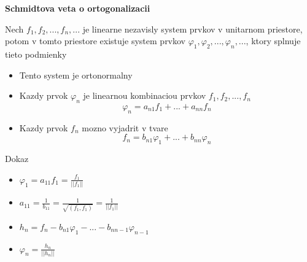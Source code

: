 \documentclass[12pt]{article}
\begin{document}
\vspace{1cm}
\textbf{Schmidtova veta o ortogonalizacii}

Nech $f_{1},f_{2},...,f_{n},...$ je linearne nezavisly system prvkov v unitarnom priestore, potom v tomto priestore existuje system prvkov
$\varphi_{1},\varphi_{2},...,\varphi_{n},...$, ktory splnuje tieto podmienky
\begin{itemize}
	\item Tento system je ortonormalny
	\item Kazdy prvok $\varphi_{n}$ je linearnou kombinaciou prvkov $f_{1},f_{2},...,f_{n}$
		\begin{equation*}
			\varphi_{n} = a_{n1}f_{1} + ... + a_{nn}f_{n}
		\end{equation*}
	\item Kazdy prvok $f_{n}$ mozno vyjadrit v tvare
		\begin{equation*}
			f_{n} = b_{n1}\varphi_{1} + ... + b_{nn}\varphi_{n}
		\end{equation*}
\end{itemize}

Dokaz
\begin{itemize}
	\item $\varphi_{1} = a_{11}f_{1} = \frac{f_{1}}{||f_{1}||}$
	\item $a_{11} = \frac{1}{b_{11}} = \frac{1}{\sqrt{(f_{1},f_{1})}} = \frac{1}{||f_{1}||}$
	\item $h_{n} = f_{n} - b_{n1}\varphi_{1} - ... - b_{nn-1}\varphi_{n-1}$
	\item $\varphi_{n} = \frac{h_{n}}{||h_{n}||}$
\end{itemize}
\end{document}
